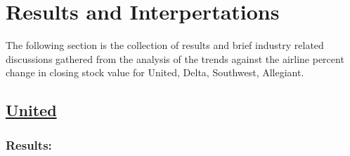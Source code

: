 \documentclass[12pt]{report}
\begin{document}
\newpage
\chapter*{Results and Interpertations}
The following section is the collection of results and brief industry related discussions gathered from the analysis of the trends against the airline percent change in closing stock value for United, Delta, Southwest, Allegiant.
\section*{\underline{United}}
\subsection*{Results:}
\end{document}
